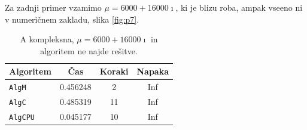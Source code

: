 \documentclass[12pt,a4paper]{amsart}
\theoremstyle{definition}
\theoremstyle{plain}
\begin{document}
Za zadnji primer vzamimo $\mu = 6000+16000\imath$, ki je blizu roba, ampak vseeno ni v numeričnem zakladu, slika \ref{fig:p7}.


\begin{table}[H]
\caption{A kompleksna, $\mu = 6000+16000\imath$ in algoritem ne najde rešitve.}
\begin{tabular}{|l|c|c|c|}
\hline
Algoritem & Čas & Koraki & Napaka\\
\hline
\hline
\verb+AlgM+ &0.456248 &2&Inf\\
\hline
\verb+AlgC+ &0.485319&11&Inf \\
\hline
\verb+AlgCPU+ &0.045177&10&Inf  \\
\hline
\end{tabular}

\label{t10}
\end{table}
\end{document}
